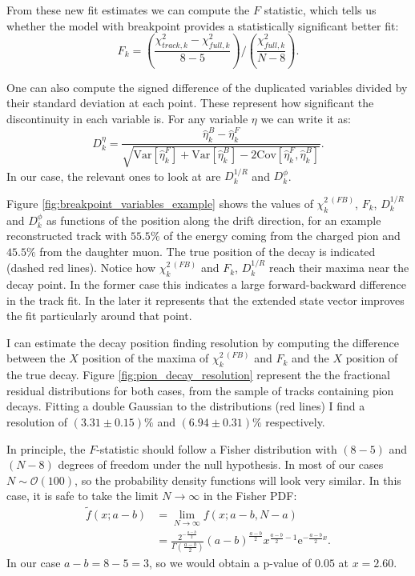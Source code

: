 From these new fit estimates we can compute the $F$ statistic, which tells us whether the model with breakpoint provides a statistically significant better fit:
\begin{equation}
	F_{k}=\left(\frac{\chi^{2}_{track,k}-\chi^{2}_{full,k}}{8-5}\right)/\left(\frac{\chi^{2}_{full,k}}{N-8}\right).
\end{equation}

One can also compute the signed difference of the duplicated variables divided by their standard deviation at each point. These represent how significant the discontinuity in each variable is. For any variable $\eta$ we can write it as:
\begin{equation}
	D^{\eta}_{k} = \frac{\hat{\eta}^{B}_{k}-\hat{\eta}^{F}_{k}}{\sqrt{\mathrm{Var}[\hat{\eta}^{F}_{k}]+\mathrm{Var}[\hat{\eta}^{B}_{k}]-2\mathrm{Cov}[\hat{\eta}^{F}_{k}, \hat{\eta}^{B}_{k}]}}.
\end{equation}
In our case, the relevant ones to look at are $D^{1/R}_{k}$ and $D^{\phi}_{k}$.

Figure \ref{fig:breakpoint_variables_example} shows the values of $\chi^{2 \ (FB)}_{k}$, $F_{k}$, $D^{1/R}_{k}$ and $D^{\phi}_{k}$ as functions of the position along the drift direction, for an example reconstructed track with $55.5\%$ of the energy coming from the charged pion and $45.5\%$ from the daughter muon. The true position of the decay is indicated (dashed red lines). Notice how $\chi^{2 \ (FB)}_{k}$ and $F_{k}$, $D^{1/R}_{k}$ reach their maxima near the decay point. In the former case this indicates a large forward-backward difference in the track fit. In the later it represents that the extended state vector improves the fit particularly around that point.

I can estimate the decay position finding resolution by computing the difference between the $X$ position of the maxima of $\chi^{2 \ (FB)}_{k}$ and $F_{k}$ and the $X$ position of the true decay. Figure \ref{fig:pion_decay_resolution} represent the  the fractional residual distributions for both cases, from the sample of tracks containing pion decays. Fitting a double Gaussian to the distributions (red lines) I find a resolution of $(3.31\pm0.15)\%$ and $(6.94\pm0.31)\%$ respectively.

In principle, the $F$-statistic should follow a Fisher distribution with $(8-5)$ and $(N-8)$ degrees of freedom under the null hypothesis. In most of our cases $N\sim\mathcal{O}(100)$, so the probability density functions will look very similar. In this case, it is safe to take the limit $N\rightarrow\infty$ in the Fisher PDF:
\begin{equation}
	\begin{split}
		\tilde{f}(x;a-b)&=\lim_{N \rightarrow \infty} f(x;a-b,N-a)\\
		&= \frac{2^{-\frac{a-b}{2}}}{\Gamma\left(\frac{a-b}{2}\right)}\left(a-b\right)^{\frac{a-b}{2}}x^{\frac{a-b}{2}-1}\mathrm{e}^{-\frac{a-b}{2}x}.
	\end{split}
\end{equation}
In our case $a-b = 8-5 = 3$, so we would obtain a p-value of $0.05$ at $x=2.60$.

